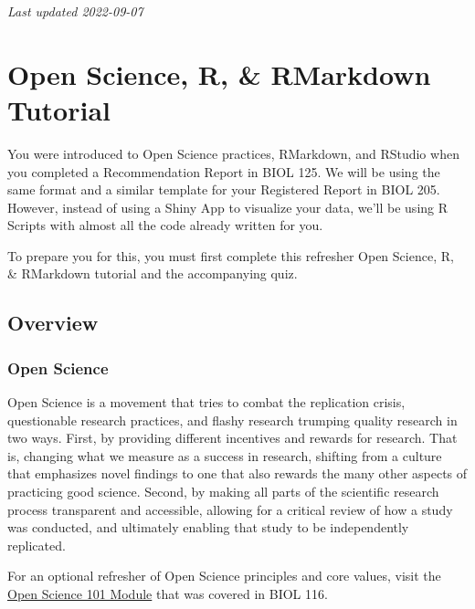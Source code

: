\documentclass[
]{book}
\begin{document}
\emph{Last updated 2022-09-07}

\hypertarget{open-science-r-rmarkdown-tutorial}{%
\chapter*{Open Science, R, \& RMarkdown Tutorial}\label{open-science-r-rmarkdown-tutorial}}

You were introduced to Open Science practices, RMarkdown, and RStudio when you completed a Recommendation Report in BIOL 125. We will be using the same format and a similar template for your Registered Report in BIOL 205. However, instead of using a Shiny App to visualize your data, we'll be using R Scripts with almost all the code already written for you.

To prepare you for this, you must first complete this refresher Open Science, R, \& RMarkdown tutorial and the accompanying quiz.

\hypertarget{overview-1}{%
\section*{Overview}\label{overview-1}}

\hypertarget{open-science}{%
\subsection*{Open Science}\label{open-science}}

Open Science is a movement that tries to combat the replication crisis, questionable research practices, and flashy research trumping quality research in two ways. First, by providing different incentives and rewards for research. That is, changing what we measure as a success in research, shifting from a culture that emphasizes novel findings to one that also rewards the many other aspects of practicing good science. Second, by making all parts of the scientific research process transparent and accessible, allowing for a critical review of how a study was conducted, and ultimately enabling that study to be independently replicated.

For an optional refresher of Open Science principles and core values, visit the \href{https://ubco-biology.github.io/OS-Introduction/principles-of-open-science.html}{Open Science 101 Module} that was covered in BIOL 116.
\end{document}
